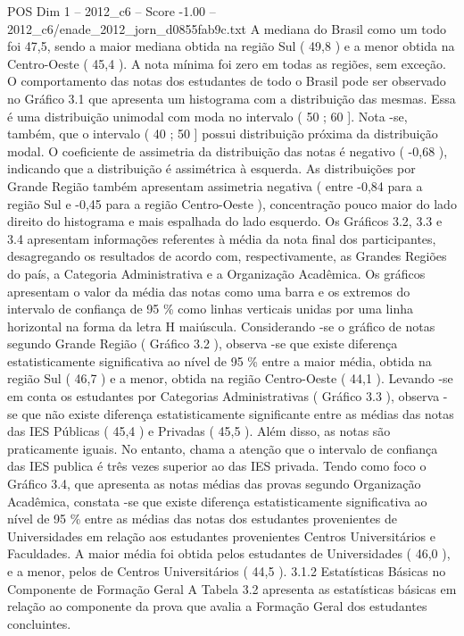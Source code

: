 \begin{textsample}{POS Dim 1 – 2012\_c6 – Score -1.00 – 2012\_c6/enade\_2012\_jorn\_d0855fab9c.txt}
A mediana do Brasil como um todo foi 47,5, sendo a maior mediana obtida na região Sul ( 49,8 ) e a menor obtida na Centro-Oeste ( 45,4 ).
A nota mínima foi zero em todas as regiões, sem exceção.
O comportamento das notas dos estudantes de todo o Brasil pode ser observado no Gráfico 3.1 que apresenta um histograma com a distribuição das mesmas.
Essa é uma distribuição unimodal com moda no intervalo ( 50 ; 60 ].
Nota -se, também, que o intervalo ( 40 ; 50 ] possui distribuição próxima da distribuição modal.
O coeficiente de assimetria da distribuição das notas é negativo ( -0,68 ), indicando que a distribuição é assimétrica à esquerda.
As distribuições por Grande Região também apresentam assimetria negativa ( entre -0,84 para a região Sul e -0,45 para a região Centro-Oeste ), concentração pouco maior do lado direito do histograma e mais espalhada do lado esquerdo.
Os Gráficos 3.2, 3.3 e 3.4 apresentam informações referentes à média da nota final dos participantes, desagregando os resultados de acordo com, respectivamente, as Grandes Regiões do país, a Categoria Administrativa e a Organização Acadêmica.
Os gráficos apresentam o valor da média das notas como uma barra e os extremos do intervalo de confiança de 95 \% como linhas verticais unidas por uma linha horizontal na forma da letra H maiúscula.
Considerando -se o gráfico de notas segundo Grande Região ( Gráfico 3.2 ), observa -se que existe diferença estatisticamente significativa ao nível de 95 \% entre a maior média, obtida na região Sul ( 46,7 ) e a menor, obtida na região Centro-Oeste ( 44,1 ).
Levando -se em conta os estudantes por Categorias Administrativas ( Gráfico 3.3 ), observa -se que não existe diferença estatisticamente significante entre as médias das notas das IES Públicas ( 45,4 ) e Privadas ( 45,5 ).
Além disso, as notas são praticamente iguais.
No entanto, chama a atenção que o intervalo de confiança das IES publica é três vezes superior ao das IES privada.
Tendo como foco o Gráfico 3.4, que apresenta as notas médias das provas segundo Organização Acadêmica, constata -se que existe diferença estatisticamente significativa ao nível de 95 \% entre as médias das notas dos estudantes provenientes de Universidades em relação aos estudantes provenientes Centros Universitários e Faculdades.
A maior média foi obtida pelos estudantes de Universidades ( 46,0 ), e a menor, pelos de Centros Universitários ( 44,5 ). 3.1.2 Estatísticas Básicas no Componente de Formação Geral A Tabela 3.2 apresenta as estatísticas básicas em relação ao componente da prova que avalia a Formação Geral dos estudantes concluintes.

\end{textsample}
